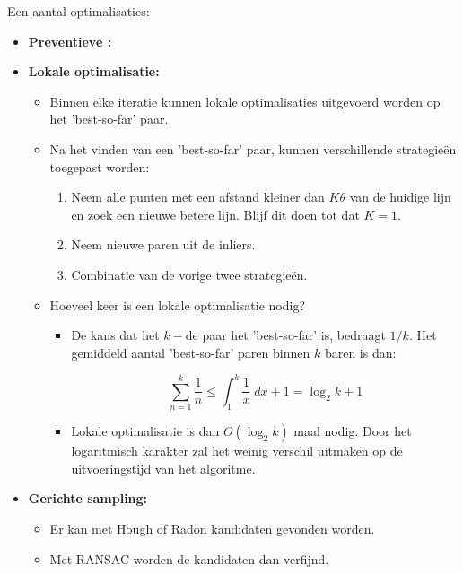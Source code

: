 Een aantal optimalisaties:
\begin{itemize}
	\item \textbf{Preventieve :}
	\item \textbf{Lokale optimalisatie:}
	\begin{itemize}
		\item Binnen elke iteratie kunnen lokale optimalisaties uitgevoerd worden op het 'best-so-far' paar.
		\item Na het vinden van een 'best-so-far' paar, kunnen verschillende strategieën toegepast worden:
		\begin{enumerate}
			\item Neem alle punten met een afstand kleiner dan $K\theta$ van de huidige lijn en zoek een nieuwe betere lijn. Blijf dit doen tot dat $K = 1$.
			\item Neem nieuwe paren uit de inliers. 
			\item Combinatie van de vorige twee strategieën.
		\end{enumerate}
		\item Hoeveel keer is een lokale optimalisatie nodig?
		\begin{itemize}
			\item De kans dat het $k-$de paar het 'best-so-far' is, bedraagt $1/k$. Het gemiddeld aantal 'best-so-far' paren binnen $k$ baren is dan:
			
			$$\sum_{n = 1}^k \frac{1}{n} \leq \int_1^k \frac{1}{x}\;dx + 1 = \log_2 k + 1$$
			\item Lokale optimalisatie is dan $O(\log_2 k)$ maal nodig.
			\good Door het logaritmisch karakter zal het weinig verschil uitmaken op de uitvoeringstijd van het algoritme.
		\end{itemize}
	\end{itemize}
	\item \textbf{Gerichte sampling:}
	\begin{itemize}
		\item Er kan met Hough of Radon kandidaten gevonden worden. 
		\item Met RANSAC worden de kandidaten dan verfijnd.
	\end{itemize}
\end{itemize}


